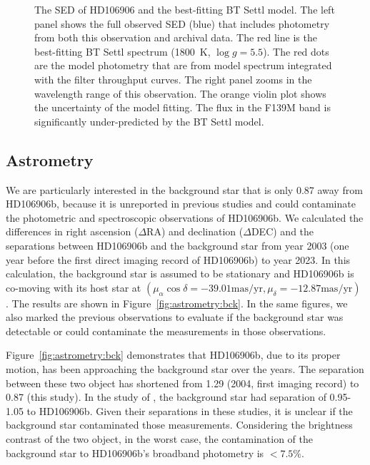 \documentclass[modern]{aastex62}
\begin{document}
\begin{figure}
  \centering
  \caption{The SED of HD106906 and the best-fitting BT Settl model. The left panel shows the full observed SED (blue) that includes photometry from both this observation and archival data. The red line is the best-fitting BT Settl spectrum (1800~K, $\log g=5.5$). The red dots are the model photometry that are from model spectrum integrated with the filter throughput curves. The right panel zooms in the wavelength range of this observation. The orange violin plot shows the uncertainty of the model fitting. The flux in the F139M band is significantly under-predicted by the BT Settl model.}
  \label{fig:SED}
\end{figure}

\subsection{Astrometry}
\label{sec:astrometry}
We are particularly interested in the background star that is only 0\arcsec{}.87 away from HD106906b, because it is unreported in previous studies and could contaminate the photometric and spectroscopic observations of HD106906b. We calculated the differences in right ascension ($\Delta$RA) and declination ($\Delta$DEC) and the separations between HD106906b and the background star from year 2003 (one year before the first direct imaging record of HD106906b) to year 2023. In this calculation, the background star is assumed to be stationary and HD106906b is co-moving with its host star at $(\mu_\alpha\cos\delta=-39.01 \mbox{mas/yr}, \mu_{\delta}=-12.87 \mbox{mas/yr})$ \citep{Gaia2016, Gaia2018}. The results are shown in Figure~\ref{fig:astrometry:bck}. In the same figures, we also marked the previous observations \citep{Bailey2013, Wu2016, Lagrange2016, Daemgen2017} to evaluate if the background star was detectable or could contaminate the measurements in those observations.

Figure~\ref{fig:astrometry:bck} demonstrates that HD106906b, due to its proper motion, has been approaching  the background star over the years. The separation between these two object has shortened from 1\arcsec.29 (2004, first imaging record) to 0\arcsec.87 (this study). In the study of \citep{Bailey2013, Wu2016, Daemgen2017}, the background star had separation of 0.95-1.05 to HD106906b. Given their separations in these studies, it is unclear if the background star contaminated those measurements. Considering the brightness contrast of the two object, in the worst case, the contamination of the background star to HD106906b's broadband photometry is  $<7.5\%$.
\end{document}
